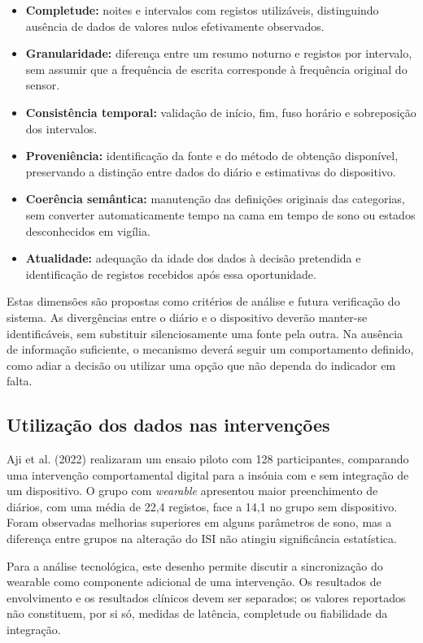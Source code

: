 \begin{itemize}
    \item \textbf{Completude:} noites e intervalos com registos utilizáveis, distinguindo ausência de dados de valores nulos efetivamente observados.
    \item \textbf{Granularidade:} diferença entre um resumo noturno e registos por intervalo, sem assumir que a frequência de escrita corresponde à frequência original do sensor.
    \item \textbf{Consistência temporal:} validação de início, fim, fuso horário e sobreposição dos intervalos.
    \item \textbf{Proveniência:} identificação da fonte e do método de obtenção disponível, preservando a distinção entre dados do diário e estimativas do dispositivo.
    \item \textbf{Coerência semântica:} manutenção das definições originais das categorias, sem converter automaticamente tempo na cama em tempo de sono ou estados desconhecidos em vigília.
    \item \textbf{Atualidade:} adequação da idade dos dados à decisão pretendida e identificação de registos recebidos após essa oportunidade.
\end{itemize}

Estas dimensões são propostas como critérios de análise e futura verificação do sistema. As divergências entre o diário e o dispositivo deverão manter-se identificáveis, sem substituir silenciosamente uma fonte pela outra. Na ausência de informação suficiente, o mecanismo deverá seguir um comportamento definido, como adiar a decisão ou utilizar uma opção que não dependa do indicador em falta.

\subsection{Utilização dos dados nas intervenções}
\label{sec:chap3_wearableInterventions}

Aji et al. (2022) realizaram um ensaio piloto com 128 participantes, comparando uma intervenção comportamental digital para a insónia com e sem integração de um dispositivo. O grupo com \textit{wearable} apresentou maior preenchimento de diários, com uma média de 22,4 registos, face a 14,1 no grupo sem dispositivo. Foram observadas melhorias superiores em alguns parâmetros de sono, mas a diferença entre grupos na alteração do ISI não atingiu significância estatística.

Para a análise tecnológica, este desenho permite discutir a sincronização do wearable como componente adicional de uma intervenção. Os resultados de envolvimento e os resultados clínicos devem ser separados; os valores reportados não constituem, por si só, medidas de latência, completude ou fiabilidade da integração.

